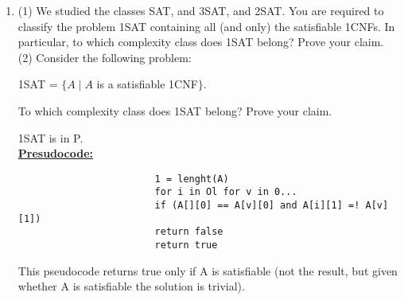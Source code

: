 \documentclass{article}
\begin{document}
\begin{enumerate}[label=\textbf{\arabic*.}, leftmargin=*]
\begin{pane}
				\end{pane}
				\item (1) We studied the classes SAT, and 3SAT, and 2SAT. You are required to classify the problem 1SAT containing all (and only) the satisfiable 1CNFs. In particular, to which complexity class does 1SAT belong? Prove your claim.\\
				
				(2) Consider the following problem:
				\begin{center}
					1SAT = $\{A \; \vert \; A$ is a satisfiable 1CNF$\}$.
				\end{center}
				To which complexity class does 1SAT belong? Prove your claim.
				\begin{pane}
					1SAT is in P.\\
					
					\textbf{\uline{Presudocode:}}
					\begin{verbatim}
						1 = lenght(A)
						for i in Ol for v in 0...
						if (A[][0] == A[v][0] and A[i][1] =! A[v][1])
						return false
						return true
					\end{verbatim}

					
					
					This pseudocode returns true only if A is satisfiable (not the result, but given whether A is satisfiable the solution is trivial).\\
					

\end{pane}
\end{enumerate}
\end{document}
